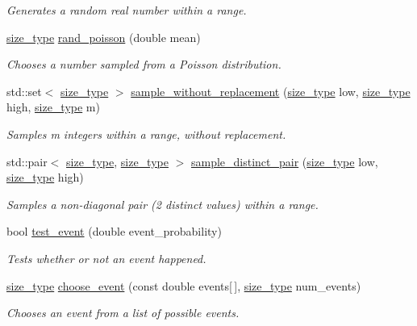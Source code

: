 \begin{DoxyCompactItemize}
\begin{DoxyCompactList}\small\item\em Generates a random real number within a range. \end{DoxyCompactList}\item 
\hyperlink{constants_8h_a8e1541b50cee66a791df4c437ccbb385}{size\+\_\+type} \hyperlink{classretrocombinator_1_1RandMaths_adef66efd4d58f6130982ff0ee0e25750}{rand\+\_\+poisson} (double mean)
\begin{DoxyCompactList}\small\item\em Chooses a number sampled from a Poisson distribution. \end{DoxyCompactList}\item 
std\+::set$<$ \hyperlink{constants_8h_a8e1541b50cee66a791df4c437ccbb385}{size\+\_\+type} $>$ \hyperlink{classretrocombinator_1_1RandMaths_a6a7fe159f46afec51d997e4d07d2cfe6}{sample\+\_\+without\+\_\+replacement} (\hyperlink{constants_8h_a8e1541b50cee66a791df4c437ccbb385}{size\+\_\+type} low, \hyperlink{constants_8h_a8e1541b50cee66a791df4c437ccbb385}{size\+\_\+type} high, \hyperlink{constants_8h_a8e1541b50cee66a791df4c437ccbb385}{size\+\_\+type} m)
\begin{DoxyCompactList}\small\item\em Samples {\itshape m} integers within a range, without replacement. \end{DoxyCompactList}\item 
std\+::pair$<$ \hyperlink{constants_8h_a8e1541b50cee66a791df4c437ccbb385}{size\+\_\+type}, \hyperlink{constants_8h_a8e1541b50cee66a791df4c437ccbb385}{size\+\_\+type} $>$ \hyperlink{classretrocombinator_1_1RandMaths_a2758ba7c9818bc664c4b751a697e1fe6}{sample\+\_\+distinct\+\_\+pair} (\hyperlink{constants_8h_a8e1541b50cee66a791df4c437ccbb385}{size\+\_\+type} low, \hyperlink{constants_8h_a8e1541b50cee66a791df4c437ccbb385}{size\+\_\+type} high)
\begin{DoxyCompactList}\small\item\em Samples a non-\/diagonal pair (2 distinct values) within a range. \end{DoxyCompactList}\item 
bool \hyperlink{classretrocombinator_1_1RandMaths_a183686140a9da18ad40c7e048ee8914e}{test\+\_\+event} (double event\+\_\+probability)
\begin{DoxyCompactList}\small\item\em Tests whether or not an event happened. \end{DoxyCompactList}\item 
\hyperlink{constants_8h_a8e1541b50cee66a791df4c437ccbb385}{size\+\_\+type} \hyperlink{classretrocombinator_1_1RandMaths_a3834f9a074546f0d588247610f16fb0e}{choose\+\_\+event} (const double events\mbox{[}$\,$\mbox{]}, \hyperlink{constants_8h_a8e1541b50cee66a791df4c437ccbb385}{size\+\_\+type} num\+\_\+events)
\begin{DoxyCompactList}\small\item\em Chooses an event from a list of possible events. \end{DoxyCompactList}\end{DoxyCompactItemize}
